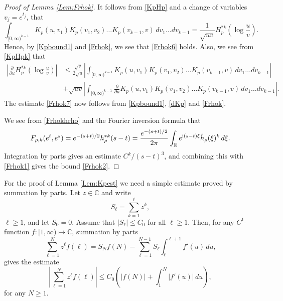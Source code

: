 \documentclass{article}
\numberwithin{equation}{section}
\numberwithin{figure}{section}
\theoremstyle{plain}
\theoremstyle{plain}
\numberwithin{thm}{section}
\theoremstyle{remark}
\newcommand{\R}{\mathbb{R}}
\newcommand{\C}{\mathbb{C}}
\newcommand{\I}{{\rm i}}
\let \le \leqslant
\let \ge \geqslant
\begin{document}
\begin{proof}[Proof of Lemma \ref{Lem:Frhok}]
It follows from \eqref{KpHp} and a change of variables $v_j=e^{t_j}$, that
\begin{equation}\label{KpHpk}
 \int_{[0,\infty)^{k-1}}K_p(u,v_1)K_p(v_1,v_2)\dots K_p(v_{k-1},v)\,
dv_1\dots dv_{k-1}=\frac 1{\sqrt{uv}}H_p^{*k}(\log\frac uv).  
\end{equation}
Hence, by \eqref{Kpbound1} and \eqref{Frhok}, we see that \eqref{Frhok6} holds. Also, we see from \eqref{KpHpk} that
\begin{align*}
    \left|\frac{\partial}{\partial u}H_p^{*k}(\log\frac uv)\right|&\le \frac{\sqrt{v}}{2\sqrt{u}}\left|\int_{[0,\infty)^{k-1}}K_p(u,v_1)K_p(v_1,v_2)\dots K_p(v_{k-1},v)\,
dv_1\dots dv_{k-1}\right|\\
&+\sqrt{uv}\left|\int_{[0,\infty)^{k-1}}\frac{\partial}{\partial u}K_p(u,v_1)K_p(v_1,v_2)\dots K_p(v_{k-1},v)\,
dv_1\dots dv_{k-1}\right|.
\end{align*}
The estimate \eqref{Frhok7} now follows from \eqref{Kpbound1}, \eqref{dKp} and \eqref{Frhok}.

We see from \eqref{Frhokhrho} and the Fourier inversion formula that
\begin{equation*}
F_{\rho,k}(e^t,e^s)=e^{-(s+t)/2}h_\rho^{*k}(s-t)=\frac{e^{-(s+t)/2}}{2\pi}\int_\R e^{\I(s-t)\xi}\hat{h}_\rho(\xi)^k\,d\xi.
\end{equation*}
Integration by parts gives an estimate $C^k/(s-t)^3$, and combining this with \eqref{Frhok1} gives the bound \eqref{Frhok2}.
\end{proof}

For the proof of Lemma \ref{Lem:Kpest} we need a simple estimate proved by summation by parts. Let $z\in\C$ and write
\begin{equation*}
S_\ell=\sum_{k=1}^\ell z^k,
\end{equation*}
$\ell\ge 1$, and let $S_0=0$. Assume that $|S_\ell|\le C_0$ for all $\ell\ge 1$. Then, for any $C^1$-function $f:[1,\infty)\mapsto\C$, summation by parts 
\begin{equation*}
\sum_{\ell=1}^N z^\ell f(\ell)=S_Nf(N)-\sum_{\ell=1}^{N-1}S_\ell\int_\ell^{\ell+1} f'(u)\,du,
\end{equation*}
gives the estimate
\begin{equation}\label{Sumparts}
\left|\sum_{\ell=1}^N z^\ell f(\ell)\right|\le C_0\left(|f(N)|+\int_1^N|f'(u)|\,du\right),
\end{equation}
for any $N\ge 1$.
\end{document}
